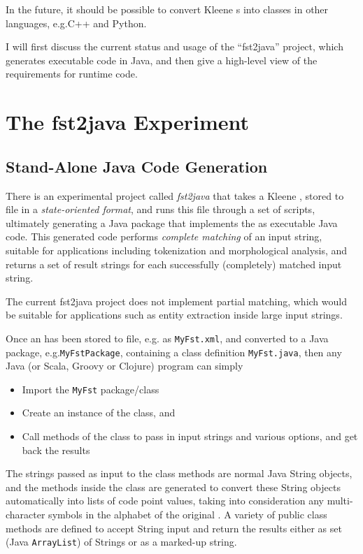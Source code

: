 In the future, it should be possible to convert Kleene \fsm{}s into classes in other languages,
e.g.\@ C++ and Python.

I will first discuss the current status and usage of the ``fst2java'' project, which generates
executable code in Java, and then give a high-level view of the requirements for runtime code.

\section{The fst2java Experiment}

\subsection{Stand-Alone Java Code Generation}

There is an experimental project called \emph{fst2java} that takes
a Kleene \fsm{}, stored to file in a \emph{state-oriented  format}, and runs
this  file through a set of  scripts, ultimately generating a Java package
that implements the \fsm{} as executable Java code.  This generated code performs \emph{complete
matching} of an input string, suitable for applications including tokenization and morphological
analysis, and returns a set of result strings for each successfully (completely) matched input
string.

The current fst2java project does not implement partial matching,
which would be suitable for applications such as entity extraction inside large input strings.

Once an \fsm{} has been stored to file, e.g. as \texttt{MyFst.xml}, and converted to 
a Java package, e.g.\@ \texttt{MyFstPackage}, containing a class definition
\texttt{MyFst.java}, then any Java (or Scala, Groovy or Clojure) program can simply

\begin{itemize}
\item
Import the \texttt{MyFst} package/class
\item
Create an instance of the class, and
\item
Call methods of the class to pass in input strings and various options, and get back the
results
\end{itemize}

\noindent The strings passed as input to the class methods are normal Java String objects, and the
methods inside the class are generated to convert these String objects automatically into lists of
code point values, taking into consideration any multi-character symbols in the alphabet of the
original \fsm{}.  A variety of public class methods are defined to accept String input and return
the results either as set (Java \texttt{ArrayList}) of Strings or as a marked-up  string.

